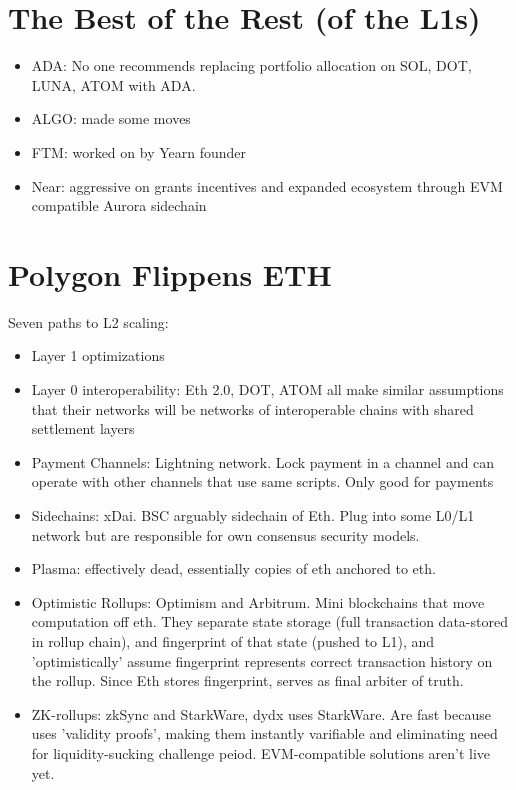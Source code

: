 \documentclass{../notes}
\begin{document}
\section{The Best of the Rest (of the L1s)}
\begin{itemize}
    \item ADA: No one recommends replacing portfolio allocation on SOL, DOT, LUNA, ATOM with ADA. 
    \item ALGO: made some moves
    \item FTM: worked on by Yearn founder
    \item Near: aggressive on grants incentives and expanded ecosystem through EVM compatible Aurora sidechain
\end{itemize}

\section{Polygon Flippens ETH}
Seven paths to L2 scaling:
\begin{itemize}
    \item Layer 1 optimizations
    \item Layer 0 interoperability: Eth 2.0, DOT, ATOM all make similar assumptions that their networks will be networks of interoperable chains with shared settlement layers
    \item Payment Channels: Lightning network. Lock payment in a channel and can operate with other channels that use same scripts. Only good for payments
    \item Sidechains: xDai. BSC arguably sidechain of Eth. Plug into some L0/L1 network but are responsible for own consensus security models. 
    \item Plasma: effectively dead, essentially copies of eth anchored to eth. 
    \item Optimistic Rollups: Optimism and Arbitrum. Mini blockchains that move computation off eth. They separate state storage (full transaction data-stored in rollup chain), and fingerprint of that state (pushed to L1), and 'optimistically' assume fingerprint represents correct transaction history on the rollup. Since Eth stores fingerprint, serves as final arbiter of truth. 
    \item ZK-rollups: zkSync and StarkWare, dydx uses StarkWare. Are fast because uses 'validity proofs', making them instantly varifiable and eliminating need for liquidity-sucking challenge peiod. EVM-compatible solutions aren't live yet. 
\end{itemize}
\end{document}
